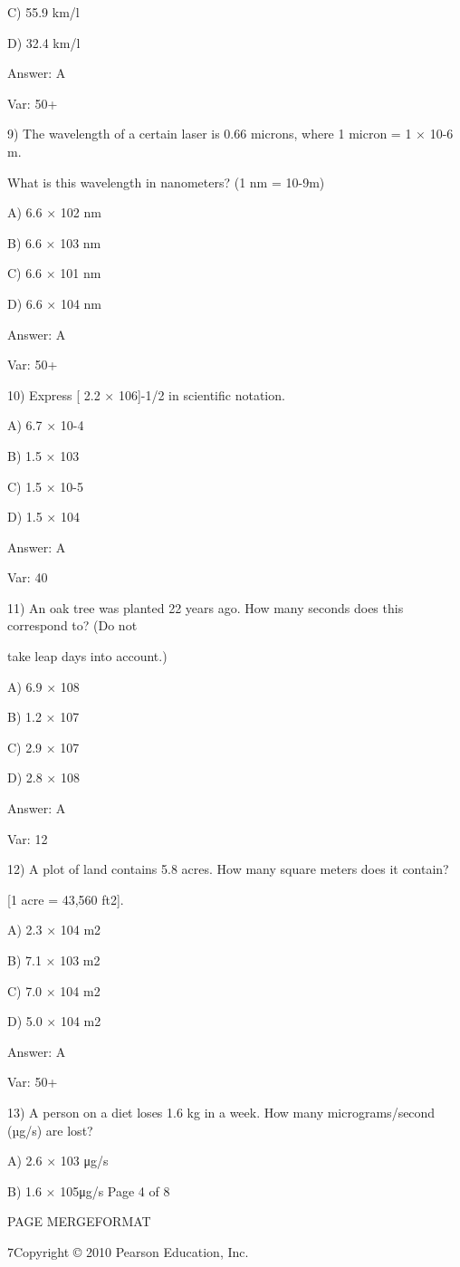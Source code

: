 C) 55.9 km/l

D) 32.4 km/l

Answer: A

Var: 50+

9) The wavelength of a certain laser is 0.66 microns, where 1 micron = 1 × 10-6 m.

What is this wavelength in nanometers? (1 nm = 10-9m)

A) 6.6 × 102 nm

B) 6.6 × 103 nm

C) 6.6 × 101 nm

D) 6.6 × 104 nm

Answer: A

Var: 50+

10) Express [ 2.2 × 106]-1/2 in scientific notation.

A) 6.7 × 10-4

B) 1.5 × 103

C) 1.5 × 10-5

D) 1.5 × 104

Answer: A

Var: 40

11) An oak tree was planted 22 years ago. How many seconds does this correspond to? (Do not

take leap days into account.)

A) 6.9 × 108

B) 1.2 × 107

C) 2.9 × 107

D) 2.8 × 108

Answer: A

Var: 12

12) A plot of land contains 5.8 acres. How many square meters does it contain?

[1 acre = 43,560 ft2].

A) 2.3 × 104 m2

B) 7.1 × 103 m2

C) 7.0 × 104 m2

D) 5.0 × 104 m2

Answer: A

Var: 50+

13) A person on a diet loses 1.6 kg in a week. How many micrograms/second (µg/s) are lost?

A) 2.6 × 103 μg/s

B) 1.6 × 105μg/s
Page 4 of 8

PAGE \* MERGEFORMAT

7Copyright © 2010 Pearson Education, Inc.


